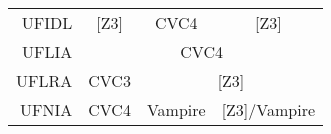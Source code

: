 \begin{table}[]
\begin{center}
{\begin{tabular}{rcccc}
\multicolumn{1}{r|}{UFIDL}      & \multicolumn{1}{c|}{{[}Z3{]}} & \multicolumn{2}{c|}{CVC4}                                           & \multicolumn{1}{c|}{{[}Z3{]}}         \\ \cline{2-5} 
\multicolumn{1}{r|}{UFLIA}      & \multicolumn{4}{c|}{CVC4}                                                                                                                   \\ \cline{2-5} 
\multicolumn{1}{r|}{UFLRA}      & \multicolumn{1}{c|}{CVC3}     & \multicolumn{3}{c|}{{[}Z3{]}}                                                                               \\ \cline{2-5} 
\multicolumn{1}{r|}{UFNIA}      & \multicolumn{1}{c|}{CVC4}     & \multicolumn{2}{c|}{Vampire}                                        & \multicolumn{1}{c|}{{[}Z3{]}/Vampire} \\ \cline{2-5} 
\end{tabular}}
\end{center}
\end{table}
